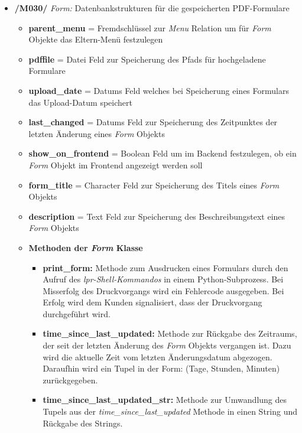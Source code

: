 \begin{itemize}
    \item \textbf{/M030/} \textit{Form:} Datenbankstrukturen für die gespeicherten PDF-Formulare
    \begin{itemize}
        \item \textbf{parent\_menu} = Fremdschlüssel zur \textit{Menu} Relation um für \textit{Form} Objekte das Eltern-Menü festzulegen
        \item \textbf{pdffile} = Datei Feld zur Speicherung des Pfads für hochgeladene Formulare
        \item \textbf{upload\_date} = Datums Feld welches bei Speicherung eines Formulars das Upload-Datum speichert
        \item \textbf{last\_changed} = Datums Feld zur Speicherung des Zeitpunktes der letzten Änderung eines \textit{Form} Objekts
        \item \textbf{show\_on\_frontend} = Boolean Feld um im Backend festzulegen, ob ein \textit{Form} Objekt im Frontend angezeigt werden soll
        \item \textbf{form\_title} = Character Feld zur Speicherung des Titels eines \textit{Form} Objekts
        \item \textbf{description} = Text Feld zur Speicherung des Beschreibungstext eines \textit{Form} Objekts
    \end{itemize}
    \begin{itemize}
    \newpage
        \item \textbf{Methoden der \textit{Form} Klasse}
        \begin{itemize}
            \item \textbf{print\_form:} Methode zum Ausdrucken eines Formulars durch den Aufruf des \textit{lpr-Shell-Kommandos} in einem Python-Subprozess. Bei Misserfolg des Druckvorgangs wird ein Fehlercode ausgegeben. Bei Erfolg wird dem Kunden signalisiert, dass der Druckvorgang durchgeführt wird.
            \item \textbf{time\_since\_last\_updated:} Methode zur Rückgabe des Zeitraums, der seit der letzten Änderung des \textit{Form} Objekts vergangen ist. Dazu wird die aktuelle Zeit vom letzten Änderungsdatum abgezogen. Daraufhin wird ein Tupel in der Form: (Tage, Stunden, Minuten) zurückgegeben.
            \item \textbf{time\_since\_last\_updated\_str:} Methode zur Umwandlung des Tupels aus der \textit{time\_since\_last\_updated} Methode in einen String und Rückgabe des Strings.
        \end{itemize}
    \end{itemize}
\end{itemize}

